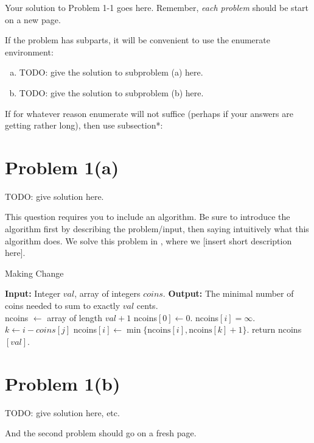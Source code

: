 \documentclass{article}
\author{Your Name Here}
\begin{document}
Your solution to Problem 1-1 goes here. Remember, \emph{each problem} should be
start on a new page.

If the problem has subparts, it will be convenient to use the enumerate
environment:
\begin{enumerate}[(a)]
    \item TODO: give the solution to subproblem (a) here.
    \item TODO: give the solution to subproblem (b) here.
\end{enumerate}

If for whatever reason enumerate will not suffice (perhaps if your answers are
getting rather long), then use subsection*:

\section*{Problem 1(a)}
TODO: give solution here.

This question requires you to include an algorithm.  Be sure to introduce the
algorithm first by describing the problem/input, then saying intuitively what
this algorithm does.  We solve this problem in , where we [insert
short description here].

\begin{algorithm}
    \caption{Making Change}
    \label{alg:coins}
    \begin{algorithmic}
        \State \textbf{Input:} Integer $val$, array of integers $coins$.
        \State \textbf{Output:} The minimal number of coins needed to sum
        to exactly $val$ cents.\\
        \hrulefill
        \State ncoins $\gets$ array of length $val+1$
        \State ncoins$[0] \gets0$.
        \State ncoins$[i]=\infty$.
        \State $k \gets i-coins[j]$
        \State ncoins$[i] \gets \min\{\text{ncoins}[i],
        \text{ncoins}[k]+1\}$.
        \EndIf
        \EndFor
        \EndFor
        \State return ncoins$[val]$.
    \end{algorithmic}
\end{algorithm}


\section*{Problem 1(b)}
TODO: give solution here, etc.

\clearpage
\header

And the second problem should go on a fresh page.
\end{document}
